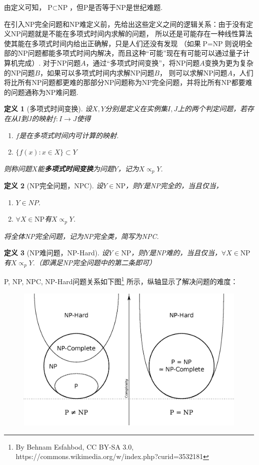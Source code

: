 \documentclass[12pt, a4paper, oneside]{ctexart}
\newtheorem{definition}{定义}[section]
\numberwithin{equation}{section}  %
\theoremstyle{definition}
\begin{document}
由定义可知，$\text{P}\subset \text{NP}$，但P是否等于NP是世纪难题.

在引入NP完全问题和NP难定义前，先给出这些定义之间的逻辑关系：由于没有定义NP问题就是不能在多项式时间内求解的问题，
所以还是可能存在一种线性算法使其能在多项式时间内给出正确解，只是人们还没有发现
（如果$\text{P} = \text{NP}$则说明全部的NP问题都能多项式时间内解决，而且这种“可能”现在有可能可以通过量子计算机完成）. 
对于NP问题$A$，通过“多项式时间变换”，将NP问题$A$变换为更为复杂的NP问题$B$，如果可以多项式时间内求解NP问题$B$，
则可以求解NP问题$A$，人们将比所有NP问题都更难的那部分NP问题称为NP完全问题，并将比所有NP都要难的问题通称为NP难问题.

\begin{definition}[多项式时间变换]
    设$X,Y$分别是定义在实例集$I,J$上的两个判定问题，若存在从$I$到$J$的映射$f:I\to J$使得
    \begin{enumerate}
        \item $f$是在多项式时间内可计算的映射.
        \item $\{f(x):x\in X\} \subset Y$
    \end{enumerate}
    则称问题$X$能\textbf{多项式时间变换}为问题$Y$，记为$X\propto_p Y$.
\end{definition}
\begin{definition}[NP完全问题，NPC]
    设$Y\in \text{NP}$，则$Y$是NP完全的，当且仅当，
    \begin{enumerate}
        \item $Y\in NP$.
        \item $\forall X\in \text{NP}$有$X\propto_p Y$.
    \end{enumerate}
    将全体NP完全问题，记为NP完全类，简写为NPC.
\end{definition}
\begin{definition}[NP难问题，NP-Hard]
    设$Y\in \text{NP}$，则$Y$是NP难的，当且仅当，$\forall X\in \text{NP}$有$X\propto_p Y$.（即满足NP完全问题中的第二条即可）
\end{definition}
P, NP, NPC, NP-Hard问题关系如下图\footnote{By Behnam Esfahbod, CC BY-SA 3.0, https://commons.wikimedia.org/w/index.php?curid=3532181}
所示，纵轴显示了解决问题的难度：
\begin{figure}[htbp]
    \centering
    \includegraphics[scale=0.5]{P_np_np-complete_np-hard.eps}
\end{figure}
\end{document}
